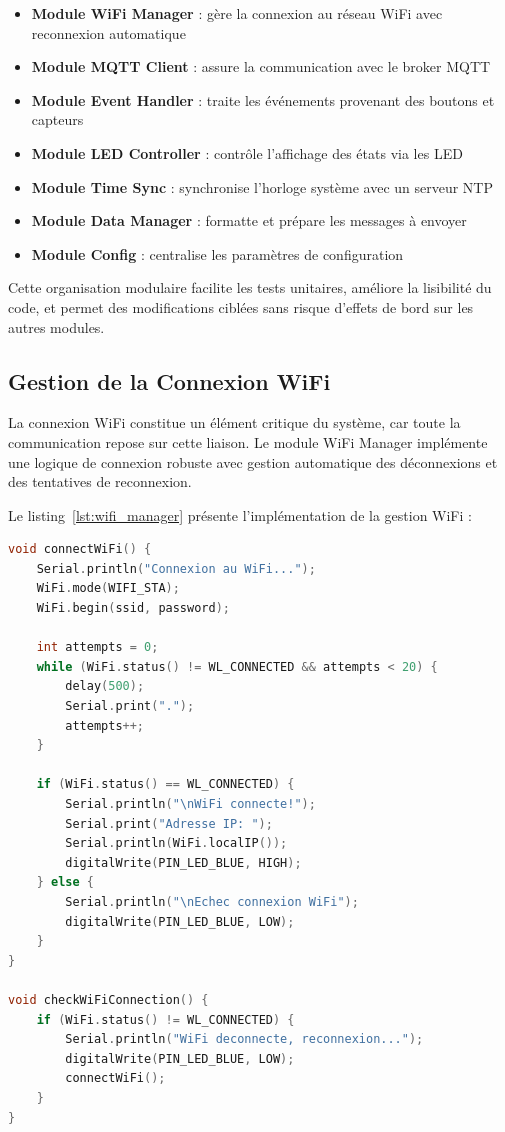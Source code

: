 \begin{itemize}[leftmargin=1.5cm]
    \item \textbf{Module WiFi Manager} : gère la connexion au réseau WiFi avec reconnexion automatique
    \item \textbf{Module MQTT Client} : assure la communication avec le broker MQTT
    \item \textbf{Module Event Handler} : traite les événements provenant des boutons et capteurs
    \item \textbf{Module LED Controller} : contrôle l'affichage des états via les LED
    \item \textbf{Module Time Sync} : synchronise l'horloge système avec un serveur NTP
    \item \textbf{Module Data Manager} : formatte et prépare les messages à envoyer
    \item \textbf{Module Config} : centralise les paramètres de configuration
\end{itemize}

Cette organisation modulaire facilite les tests unitaires, améliore la lisibilité du code, et permet des modifications ciblées sans risque d'effets de bord sur les autres modules.

\subsection{Gestion de la Connexion WiFi}
\label{subsec:impl_wifi}

La connexion WiFi constitue un élément critique du système, car toute la communication repose sur cette liaison. Le module WiFi Manager implémente une logique de connexion robuste avec gestion automatique des déconnexions et des tentatives de reconnexion.

Le listing~\ref{lst:wifi_manager} présente l'implémentation de la gestion WiFi :

\begin{lstlisting}[language=C++, caption={Module de gestion WiFi avec reconnexion automatique}, label={lst:wifi_manager}, captionpos=b]
void connectWiFi() {
    Serial.println("Connexion au WiFi...");
    WiFi.mode(WIFI_STA);
    WiFi.begin(ssid, password);
    
    int attempts = 0;
    while (WiFi.status() != WL_CONNECTED && attempts < 20) {
        delay(500);
        Serial.print(".");
        attempts++;
    }
    
    if (WiFi.status() == WL_CONNECTED) {
        Serial.println("\nWiFi connecte!");
        Serial.print("Adresse IP: ");
        Serial.println(WiFi.localIP());
        digitalWrite(PIN_LED_BLUE, HIGH);
    } else {
        Serial.println("\nEchec connexion WiFi");
        digitalWrite(PIN_LED_BLUE, LOW);
    }
}

void checkWiFiConnection() {
    if (WiFi.status() != WL_CONNECTED) {
        Serial.println("WiFi deconnecte, reconnexion...");
        digitalWrite(PIN_LED_BLUE, LOW);
        connectWiFi();
    }
}
\end{lstlisting}

